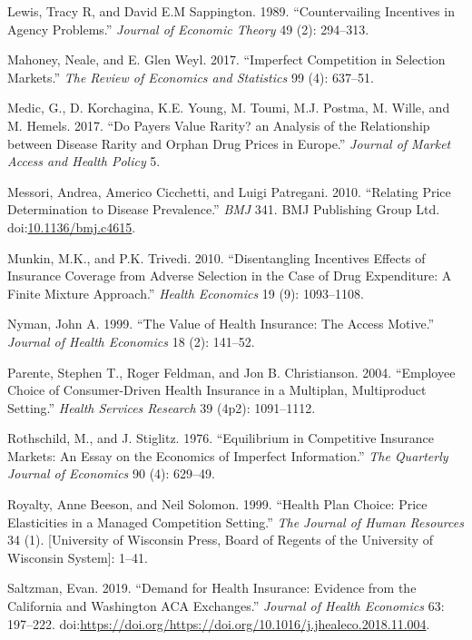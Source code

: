 \documentclass[a4paper,12pt]{article}
\begin{document}
\hypertarget{citeproc_bib_item_27}{Lewis, Tracy R, and David E.M Sappington. 1989. “Countervailing Incentives in Agency Problems.” \textit{Journal of Economic Theory} 49 (2): 294–313.}

\hypertarget{citeproc_bib_item_28}{Mahoney, Neale, and E. Glen Weyl. 2017. “Imperfect Competition in Selection Markets.” \textit{The Review of Economics and Statistics} 99 (4): 637–51.}

\hypertarget{citeproc_bib_item_29}{Medic, G., D. Korchagina, K.E. Young, M. Toumi, M.J. Postma, M. Wille, and M. Hemels. 2017. “Do Payers Value Rarity? an Analysis of the Relationship between Disease Rarity and Orphan Drug Prices in Europe.” \textit{Journal of Market Access and Health Policy} 5.}

\hypertarget{citeproc_bib_item_30}{Messori, Andrea, Americo Cicchetti, and Luigi Patregani. 2010. “Relating Price Determination to Disease Prevalence.” \textit{BMJ} 341. BMJ Publishing Group Ltd. doi:\href{https://doi.org/10.1136/bmj.c4615}{10.1136/bmj.c4615}.}

\hypertarget{citeproc_bib_item_31}{Munkin, M.K., and P.K. Trivedi. 2010. “Disentangling Incentives Effects of Insurance Coverage from Adverse Selection in the Case of Drug Expenditure: A Finite Mixture Approach.” \textit{Health Economics} 19 (9): 1093–1108.}

\hypertarget{citeproc_bib_item_32}{Nyman, John A. 1999. “The Value of Health Insurance: The Access Motive.” \textit{Journal of Health Economics} 18 (2): 141–52.}

\hypertarget{citeproc_bib_item_33}{Parente, Stephen T., Roger Feldman, and Jon B. Christianson. 2004. “Employee Choice of Consumer-Driven Health Insurance in a Multiplan, Multiproduct Setting.” \textit{Health Services Research} 39 (4p2): 1091–1112.}

\hypertarget{citeproc_bib_item_34}{Rothschild, M., and J. Stiglitz. 1976. “Equilibrium in Competitive Insurance Markets: An Essay on the Economics of Imperfect Information.” \textit{The Quarterly Journal of Economics} 90 (4): 629–49.}

\hypertarget{citeproc_bib_item_35}{Royalty, Anne Beeson, and Neil Solomon. 1999. “Health Plan Choice: Price Elasticities in a Managed Competition Setting.” \textit{The Journal of Human Resources} 34 (1). [University of Wisconsin Press, Board of Regents of the University of Wisconsin System]: 1–41.}

\hypertarget{citeproc_bib_item_36}{Saltzman, Evan. 2019. “Demand for Health Insurance: Evidence from the California and Washington ACA Exchanges.” \textit{Journal of Health Economics} 63: 197–222. doi:\url{https://doi.org/https://doi.org/10.1016/j.jhealeco.2018.11.004}.}
\end{document}
